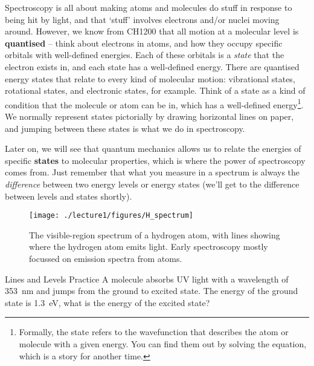 Spectroscopy is all about making atoms and molecules do stuff in response to being hit by light, and that `stuff' involves electrons and/or nuclei moving around. However, we know from CH1200 that all motion at a molecular level is \textbf{quantised} -- think about electrons in atoms, and how they occupy specific orbitals with well-defined energies. Each of these orbitals is a \textit{state} that the electron exists in, and each state has a well-defined energy. There are quantised energy states that relate to every kind of molecular motion: vibrational states, rotational states, and electronic states, for example. Think of a state as a kind of condition that the molecule or atom can be in, which has a well-defined energy\footnote{Formally, the state refers to the wavefunction that describes the atom or molecule with a given energy. You can find them out by solving the \schro equation, which is a story for another time.}. We normally represent states pictorially by drawing horizontal lines on paper, and jumping between these states is what we do in spectroscopy.

Later on, we will see that quantum mechanics allows us to relate the energies of specific \textbf{states} to molecular properties, which is where the power of spectroscopy comes from. Just remember that what you measure in a spectrum is always the \textit{difference} between two energy levels or energy states (we'll get to the difference between levels and states shortly).

\begin{figure}[h]
\centering
\texttt{[image: ./lecture1/figures/H\_spectrum]}
\caption{The visible-region spectrum of a hydrogen atom, with lines showing where the hydrogen atom emits light. Early spectroscopy mostly focussed on emission spectra from atoms.}\label{fig:lines}
\end{figure}

\begin{exercise}{Lines and Levels Practice}
A molecule absorbs UV light with a wavelength of \SI{353}{\nano\metre} and jumps from the ground to excited state. The energy of the ground state is \SI{1.3}{\electronvolt}, what is the energy of the excited state?
\end{exercise}

